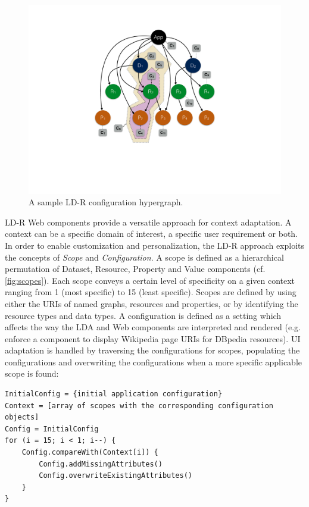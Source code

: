 \documentclass{acm_proc_article-sp}
\begin{document}
\begin{figure}[tb]
 \center
  \includegraphics[width=.73\linewidth]{images/exampleConfig.pdf}
  \caption{A sample LD-R configuration hypergraph.}
  \label{fig:exampleConfig}
\end{figure}

LD-R Web components provide a versatile approach for context adaptation.
A context can be a specific domain of interest, a specific user requirement or both.
In order to enable customization and personalization, the LD-R approach exploits the concepts of \emph{Scope} and \emph{Configuration}.
A scope is defined as a hierarchical permutation of Dataset, Resource, Property and Value components (cf. \autoref{fig:scopes}).
Each scope conveys a certain level of specificity on a given context ranging from 1 (most specific) to 15 (least specific).
Scopes are defined by using either the URIs of named graphs, resources and properties, or by identifying the resource types and data types.
A configuration is defined as a setting which affects the way the LDA and Web components are interpreted and rendered (e.g. enforce a component to display Wikipedia page URIs for DBpedia resources).
UI adaptation is handled by traversing the configurations for scopes, populating the configurations and overwriting the configurations when a more specific applicable scope is found:

\begin{lstlisting}[firstnumber=1, backgroundcolor=\color{white}, basicstyle=\small\tt, label=code:adaptation, caption=Algorithm for the LD-R UI adaptation.]
InitialConfig = {initial application configuration}
Context = [array of scopes with the corresponding configuration objects]
Config = InitialConfig
for (i = 15; i < 1; i--) {
    Config.compareWith(Context[i]) {
        Config.addMissingAttributes()
        Config.overwriteExistingAttributes()
    }
}
\end{lstlisting}
\end{document}
